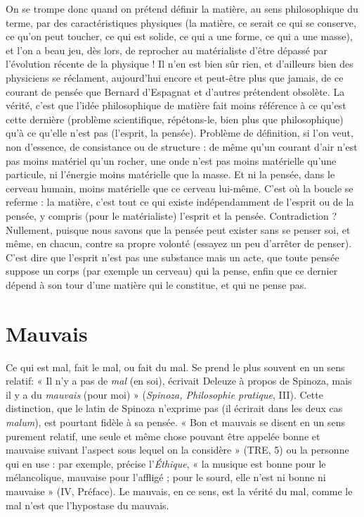 On se trompe donc quand on prétend définir la matière, au sens philosophique
du terme, par des caractéristiques physiques (la matière, ce serait ce qui
se conserve, ce qu’on peut toucher, ce qui est solide, ce qui a une forme, ce qui
a une masse), et l’on a beau jeu, dès lors, de reprocher au matérialiste d’être
dépassé par l’évolution récente de la physique ! Il n’en est bien sûr rien, et
d’ailleurs bien des physiciens se réclament, aujourd’hui encore et peut-être plus
que jamais, de ce courant de pensée que Bernard d’Espagnat et d’autres prétendent
obsolète. La vérité, c’est que l’idée philosophique de matière fait moins
référence à ce qu’est cette dernière (problème scientifique, répétons-le, bien
plus que philosophique) qu’à ce qu’elle n’est pas (l'esprit, la pensée). Problème
de définition, si l’on veut, non d’essence, de consistance ou de structure : de
même qu’un courant d’air n’est pas moins matériel qu’un rocher, une onde
n’est pas moins matérielle qu’une particule, ni l’énergie moins matérielle que la
masse. Et ni la pensée, dans le cerveau humain, moins matérielle que ce cerveau
lui-même. C’est où la boucle se referme : la matière, c’est tout ce qui existe
indépendamment de l'esprit ou de la pensée, y compris (pour le matérialiste)
l'esprit et la pensée. Contradiction ? Nullement, puisque nous savons que la
pensée peut exister sans se penser soi, et même, en chacun, contre sa propre
volonté (essayez un peu d’arrêter de penser). C’est dire que l’esprit n’est pas une
substance mais un acte, que toute pensée suppose un corps (par exemple un
cerveau) qui la pense, enfin que ce dernier dépend à son tour d’une matière qui
le constitue, et qui ne pense pas.

\section{Mauvais}
Ce qui est mal, fait le mal, ou fait du mal. Se prend le plus souvent
en un sens relatif: « Il n’y a pas de {\it mal} (en soi), écrivait
Deleuze à propos de Spinoza, mais il y a du {\it mauvais} (pour moi) » ({\it Spinoza,
Philosophie pratique}, III). Cette distinction, que le latin de Spinoza n’exprime
pas (il écrirait dans les deux cas {\it malum}), est pourtant fidèle à sa pensée. « Bon
et mauvais se disent en un sens purement relatif, une seule et même chose pouvant
être appelée bonne et mauvaise suivant l’aspect sous lequel on la
considère » (TRE, 5) ou la personne qui en use : par exemple, précise l’{\it Éthique},
« la musique est bonne pour le mélancolique, mauvaise pour l’affligé ; pour le
sourd, elle n’est ni bonne ni mauvaise » (IV, Préface). Le mauvais, en ce sens,
est la vérité du mal, comme le mal n’est que l’hypostase du mauvais.

